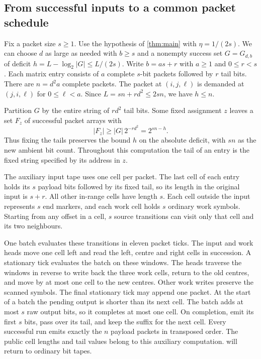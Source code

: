 \subsection{From successful inputs to a common packet schedule}

Fix a packet size $s\ge1$. Use the hypothesis of \cref{thm:main} with $\eta=1/(2s)$.
We can choose $d$ as large as needed with $b\ge s$ and a nonempty success
set $G=G_{d,b}$ of deficit $h=L-\log_2|G|\le L/(2s)$. Write $b=as+r$
with $a\ge1$ and $0\le r<s$. Each matrix entry consists of $a$ complete
$s$-bit packets followed by $r$ tail bits. There are $n=d^2a$ complete
packets. The packet at $(i,j,\ell)$ is demanded at $(j,i,\ell)$ for $0\le\ell<a$. Since $L=sn+rd^2\le2sn$, we have $h\le n$.

Partition $G$ by the entire string of $rd^2$ tail bits. Some fixed
assignment $z$ leaves a set $F_z$ of successful packet arrays with
\[
  |F_z|\ge |G|\,2^{-rd^2}=2^{sn-h}.
\]
Thus fixing the tails preserves the bound $h$ on the absolute deficit,
with $sn$ as the new ambient bit count. Throughout this computation the
tail of an entry is the fixed string specified by its address in $z$.

The auxiliary input tape uses one cell per packet. The last cell of each
entry holds its $s$ payload bits followed by its fixed tail, so its length
in the original input is $s+r$. All other in-range cells have length $s$.
Each cell outside the input represents $s$ end markers, and each work cell
holds $s$ ordinary work symbols. Starting from any offset in a cell, $s$
source transitions can visit only that cell and its two neighbours.

One batch evaluates these transitions in eleven packet ticks. The input
and work heads move one cell left and read the left, centre and right
cells in succession. A stationary tick evaluates the batch on these
windows. The heads traverse the windows in reverse to write back the
three work cells, return to the old centres, and move by at most one cell
to the new centres. Other work writes preserve the scanned symbols. The final stationary tick may append one packet.
At the start of a batch the pending output is shorter than its next
cell. The batch adds at most $s$ raw output bits, so it completes at
most one cell. On completion, emit its first $s$ bits, pass over its
tail, and keep the suffix for the next cell. Every successful run emits
exactly the $n$ payload packets in transposed order. The public cell
lengths and tail values belong to this auxiliary computation.
 will return to ordinary bit tapes.

